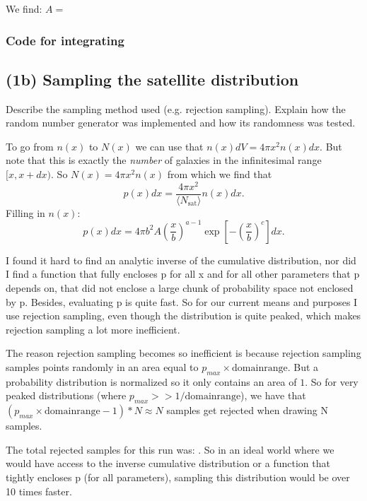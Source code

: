 \documentclass{article}
\newcommand{\CodeDir}{Code}
\begin{document}
We find: $A = $


\subsubsection{Code for integrating}


\subsection{(1b) Sampling the satellite distribution}

Describe the sampling method used (e.g. rejection sampling).  
Explain how the random number generator was implemented and how its randomness was tested.

To go from $n(x)$ to $N(x)$ we can use that $n(x)dV = 4\pi x^2 n(x) dx$.
But note that this is exactly the \textit{number} of galaxies in the infinitesimal range $[x, x+dx)$.
So $N(x) = 4\pi x^2 n(x)$ from which we find that
\begin{equation}
  p(x)dx = \frac{4\pi x^2}{ \langle N_\mathrm{sat}\rangle } n(x) dx.
\end{equation}
Filling in $n(x)$:
\begin{equation}
  p(x)dx = 
  4\pi b^2
  A 
  \left( \frac{x}{b}\right)^{a-1}
  \exp\left[-\left(\frac{x}{b}\right)^c\right] 
  dx.
\end{equation}

I found it hard to find an analytic inverse of the cumulative distribution, nor did I find a function 
that fully encloses p for all x and for all other parameters that p depends on, that did not enclose a 
large chunk of probability space not enclosed by p. Besides, evaluating p is quite fast. So for our current 
means and purposes I use rejection sampling, even though the
distribution is quite peaked, which makes rejection sampling a lot more inefficient.

The reason rejection sampling becomes so inefficient is because rejection sampling 
samples points randomly in an area equal to $p_{max} \times \mathrm{domain range}$. But 
a probability distribution is normalized so it only contains an area of $1$.
So for very peaked distributions (where $p_{max} >> 1/\mathrm{domain range}$), we have that
$(p_{max} \times \mathrm{domain range} - 1) * N \approx N$ samples get rejected when drawing N samples.

The total rejected samples for this run was: .
So in an ideal world where we would have access to the inverse cumulative distribution
or a function that tightly encloses p (for all parameters), sampling this distribution would be over 10 times faster.
\end{document}
